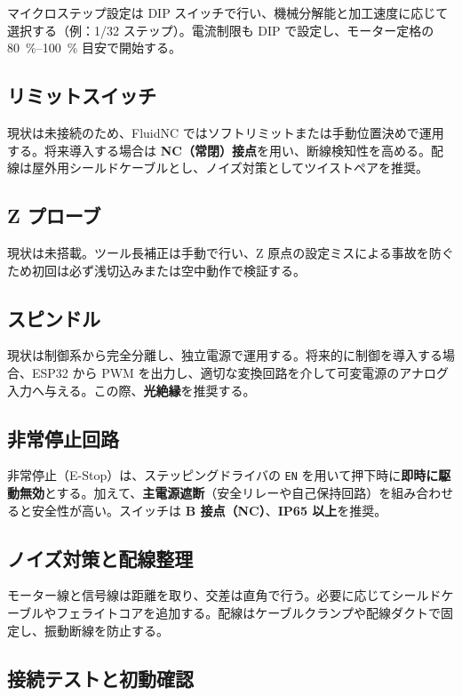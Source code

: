 \documentclass[uplatex,dvipdfmx]{ujarticle}
\begin{document}
マイクロステップ設定は DIP スイッチで行い、機械分解能と加工速度に応じて選択する（例：1/32 ステップ）。電流制限も DIP で設定し、モーター定格の \SIrange{80}{100}{\percent} 目安で開始する。

\subsection{リミットスイッチ}

現状は未接続のため、FluidNC ではソフトリミットまたは手動位置決めで運用する。将来導入する場合は \textbf{NC（常閉）接点}を用い、断線検知性を高める。配線は屋外用シールドケーブルとし、ノイズ対策としてツイストペアを推奨。

\subsection{Z プローブ}

現状は未搭載。ツール長補正は手動で行い、Z 原点の設定ミスによる事故を防ぐため初回は必ず浅切込みまたは空中動作で検証する。

\subsection{スピンドル}

現状は制御系から完全分離し、独立電源で運用する。将来的に制御を導入する場合、ESP32 から PWM を出力し、適切な変換回路を介して可変電源のアナログ入力へ与える。この際、\textbf{光絶縁}を推奨する。

\subsection{非常停止回路}

非常停止（E-Stop）は、ステッピングドライバの \texttt{EN} を用いて押下時に\textbf{即時に駆動無効}とする。加えて、\textbf{主電源遮断}（安全リレーや自己保持回路）を組み合わせると安全性が高い。スイッチは \textbf{B 接点（NC）}、\textbf{IP65 以上}を推奨。

\subsection{ノイズ対策と配線整理}

モーター線と信号線は距離を取り、交差は直角で行う。必要に応じてシールドケーブルやフェライトコアを追加する。配線はケーブルクランプや配線ダクトで固定し、振動断線を防止する。

\subsection{接続テストと初動確認}
\end{document}
